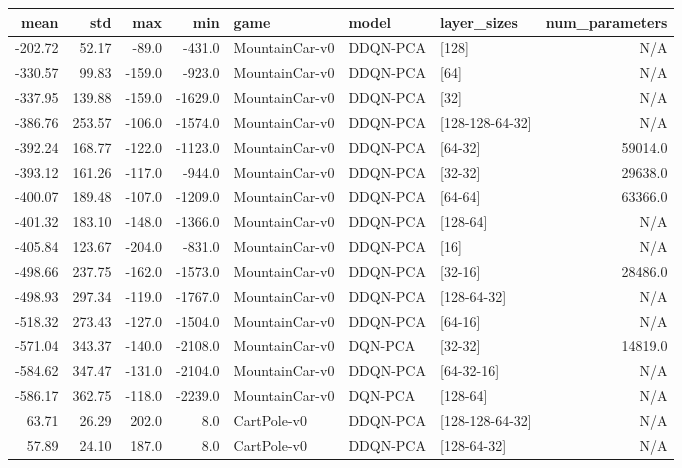 \begin{tabular}{rrrrlllr}
\toprule
   mean &     std &    max &     min &            game &     model &      layer\_sizes &  num\_parameters \\
\midrule
-202.72 &   52.17 &  -89.0 &  -431.0 &  MountainCar-v0 &  DDQN-PCA &            [128] &             N/A \\
-330.57 &   99.83 & -159.0 &  -923.0 &  MountainCar-v0 &  DDQN-PCA &             [64] &             N/A \\
-337.95 &  139.88 & -159.0 & -1629.0 &  MountainCar-v0 &  DDQN-PCA &             [32] &             N/A \\
-386.76 &  253.57 & -106.0 & -1574.0 &  MountainCar-v0 &  DDQN-PCA &  [128-128-64-32] &             N/A \\
-392.24 &  168.77 & -122.0 & -1123.0 &  MountainCar-v0 &  DDQN-PCA &          [64-32] &         59014.0 \\
-393.12 &  161.26 & -117.0 &  -944.0 &  MountainCar-v0 &  DDQN-PCA &          [32-32] &         29638.0 \\
-400.07 &  189.48 & -107.0 & -1209.0 &  MountainCar-v0 &  DDQN-PCA &          [64-64] &         63366.0 \\
-401.32 &  183.10 & -148.0 & -1366.0 &  MountainCar-v0 &  DDQN-PCA &         [128-64] &             N/A \\
-405.84 &  123.67 & -204.0 &  -831.0 &  MountainCar-v0 &  DDQN-PCA &             [16] &             N/A \\
-498.66 &  237.75 & -162.0 & -1573.0 &  MountainCar-v0 &  DDQN-PCA &          [32-16] &         28486.0 \\
-498.93 &  297.34 & -119.0 & -1767.0 &  MountainCar-v0 &  DDQN-PCA &      [128-64-32] &             N/A \\
-518.32 &  273.43 & -127.0 & -1504.0 &  MountainCar-v0 &  DDQN-PCA &          [64-16] &             N/A \\
-571.04 &  343.37 & -140.0 & -2108.0 &  MountainCar-v0 &   DQN-PCA &          [32-32] &         14819.0 \\
-584.62 &  347.47 & -131.0 & -2104.0 &  MountainCar-v0 &  DDQN-PCA &       [64-32-16] &             N/A \\
-586.17 &  362.75 & -118.0 & -2239.0 &  MountainCar-v0 &   DQN-PCA &         [128-64] &             N/A \\
  63.71 &   26.29 &  202.0 &     8.0 &     CartPole-v0 &  DDQN-PCA &  [128-128-64-32] &             N/A \\
  57.89 &   24.10 &  187.0 &     8.0 &     CartPole-v0 &  DDQN-PCA &      [128-64-32] &             N/A \\

\end{tabular}
